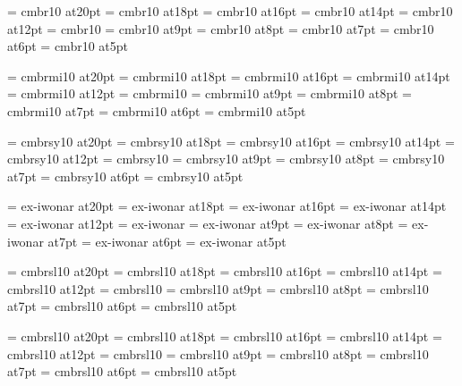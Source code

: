 
\font\twentyrm=     cmbr10 at20pt
\font\eighteenrm=   cmbr10 at18pt
\font\sixteenrm=    cmbr10 at16pt
\font\fourteenrm=   cmbr10 at14pt
\font\twelverm=     cmbr10 at12pt
\font\tenrm=        cmbr10
\font\ninerm=       cmbr10 at9pt
\font\eightrm=      cmbr10 at8pt
\font\sevenrm=      cmbr10 at7pt
\font\sixrm=        cmbr10 at6pt
\font\fiverm=       cmbr10 at5pt

\font\twentyi=      cmbrmi10 at20pt
\font\eighteeni=    cmbrmi10 at18pt
\font\sixteeni=     cmbrmi10 at16pt
\font\fourteeni=    cmbrmi10 at14pt
\font\twelvei=      cmbrmi10 at12pt
\font\teni=         cmbrmi10
\font\ninei=        cmbrmi10 at9pt
\font\eighti=       cmbrmi10 at8pt
\font\seveni=       cmbrmi10 at7pt
\font\sixi=         cmbrmi10 at6pt
\font\fivei=        cmbrmi10 at5pt

\font\twentysy=     cmbrsy10 at20pt
\font\eighteensy=   cmbrsy10 at18pt
\font\sixteensy=    cmbrsy10 at16pt
\font\fourteensy=   cmbrsy10 at14pt
\font\twelvesy=     cmbrsy10 at12pt
\font\tensy=        cmbrsy10
\font\ninesy=       cmbrsy10 at9pt
\font\eightsy=      cmbrsy10 at8pt
\font\sevensy=      cmbrsy10 at7pt
\font\sixsy=        cmbrsy10 at6pt
\font\fivesy=       cmbrsy10 at5pt

\font\twentyex=     ex-iwonar at20pt
\font\eighteenex=   ex-iwonar at18pt
\font\sixteenex=    ex-iwonar at16pt
\font\fourteenex=   ex-iwonar at14pt
\font\twelveex=     ex-iwonar at12pt
\font\tenex=        ex-iwonar
\font\nineex=       ex-iwonar at9pt
\font\eightex=      ex-iwonar at8pt
\font\sevenex=      ex-iwonar at7pt
\font\sixex=        ex-iwonar at6pt
\font\fiveex=       ex-iwonar at5pt

\font\twentyit=     cmbrsl10 at20pt
\font\eighteenit=   cmbrsl10 at18pt
\font\sixteenit=    cmbrsl10 at16pt
\font\fourteenit=   cmbrsl10 at14pt
\font\twelveit=     cmbrsl10 at12pt
\font\tenit=        cmbrsl10
\font\nineit=       cmbrsl10 at9pt
\font\eightit=      cmbrsl10 at8pt
\font\sevenit=      cmbrsl10 at7pt
\font\sixit=        cmbrsl10 at6pt
\font\fiveit=       cmbrsl10 at5pt

\font\twentysl=     cmbrsl10 at20pt
\font\eighteensl=   cmbrsl10 at18pt
\font\sixteensl=    cmbrsl10 at16pt
\font\fourteensl=   cmbrsl10 at14pt
\font\twelvesl=     cmbrsl10 at12pt
\font\tensl=        cmbrsl10
\font\ninesl=       cmbrsl10 at9pt
\font\eightsl=      cmbrsl10 at8pt
\font\sevensl=      cmbrsl10 at7pt
\font\sixsl=        cmbrsl10 at6pt
\font\fivesl=       cmbrsl10 at5pt

